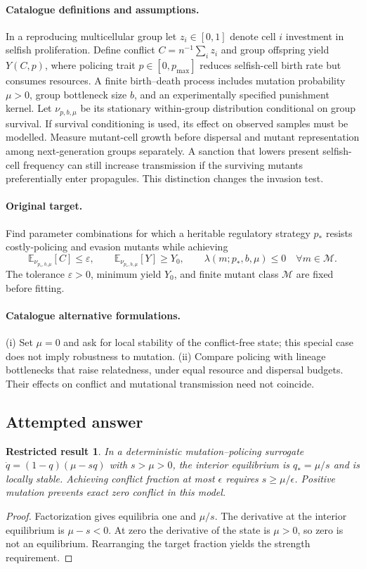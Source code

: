 \documentclass[11pt]{article}
\newcommand{\E}{\mathbb E}
\providecommand{\E}{\mathbb E}
\newtheorem{attemptresult}{Restricted result}[section]
\begin{document}
\paragraph{Catalogue definitions and assumptions.}
In a reproducing multicellular group let $z_i\in[0,1]$ denote cell $i$ investment in selfish proliferation. Define conflict $C=n^{-1}\sum_i z_i$ and group offspring yield $Y(C,p)$, where policing trait $p\in[0,p_{\max}]$ reduces selfish-cell birth rate but consumes resources. A finite birth--death process includes mutation probability $\mu>0$, group bottleneck size $b$, and an experimentally specified punishment kernel. Let $\nu_{p,b,\mu}$ be its stationary within-group distribution conditional on group survival. If survival conditioning is used, its effect on observed samples must be modelled. Measure mutant-cell growth before dispersal and mutant representation among next-generation groups separately. A sanction that lowers present selfish-cell frequency can still increase transmission if the surviving mutants preferentially enter propagules. This distinction changes the invasion test.
\paragraph{Original target.}
Find parameter combinations for which a heritable regulatory strategy $p_*$ resists costly-policing and evasion mutants while achieving
\[
 \E_{\nu_{p_*,b,\mu}}[C]\le\varepsilon,
 \qquad \E_{\nu_{p_*,b,\mu}}[Y]\ge Y_0,
 \qquad \lambda(m;p_*,b,\mu)\le0\quad\forall m\in\mathcal M.
\]
The tolerance $\varepsilon>0$, minimum yield $Y_0$, and finite mutant class $\mathcal M$ are fixed before fitting.
\paragraph{Catalogue alternative formulations.}
(i) Set $\mu=0$ and ask for local stability of the conflict-free state; this special case does not imply robustness to mutation. (ii) Compare policing with lineage bottlenecks that raise relatedness, under equal resource and dispersal budgets. Their effects on conflict and mutational transmission need not coincide.
\subsection{Attempted answer}
\begin{attemptresult}
In a deterministic mutation--policing surrogate $\dot q=(1-q)(\mu-sq)$ with $s>\mu>0$, the interior equilibrium is $q_* =\mu/s$ and is locally stable. Achieving conflict fraction at most $\epsilon$ requires $s\geq\mu/\epsilon$. Positive mutation prevents exact zero conflict in this model.
\end{attemptresult}
\begin{proof}
Factorization gives equilibria one and $\mu/s$. The derivative at the interior equilibrium is $\mu-s<0$. At zero the derivative of the state is $\mu>0$, so zero is not an equilibrium. Rearranging the target fraction yields the strength requirement.
\end{proof}
\end{document}
